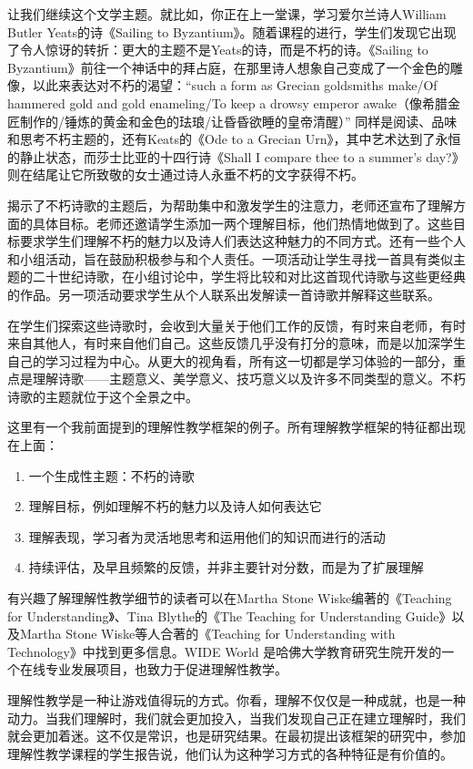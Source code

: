 让我们继续这个文学主题。就比如，你正在上一堂课，学习爱尔兰诗人William Butler Yeats的诗《Sailing to Byzantium》。随着课程的进行，学生们发现它出现了令人惊讶的转折：更大的主题不是Yeats的诗，而是不朽的诗。《Sailing to Byzantium》前往一个神话中的拜占庭，在那里诗人想象自己变成了一个金色的雕像，以此来表达对不朽的渴望：“such a form as Grecian goldsmiths make/Of hammered gold and gold enameling/To keep a drowsy emperor awake（像希腊金匠制作的/锤炼的黄金和金色的珐琅/让昏昏欲睡的皇帝清醒）” 同样是阅读、品味和思考不朽主题的，还有Keats的《Ode to a Grecian Urn》，其中艺术达到了永恒的静止状态，而莎士比亚的十四行诗《Shall I compare thee to a summer’s day?》则在结尾让它所致敬的女士通过诗人永垂不朽的文字获得不朽。

揭示了不朽诗歌的主题后，为帮助集中和激发学生的注意力，老师还宣布了理解方面的具体目标。老师还邀请学生添加一两个理解目标，他们热情地做到了。这些目标要求学生们理解不朽的魅力以及诗人们表达这种魅力的不同方式。还有一些个人和小组活动，旨在鼓励积极参与和个人责任。一项活动让学生寻找一首具有类似主题的二十世纪诗歌，在小组讨论中，学生将比较和对比这首现代诗歌与这些更经典的作品。另一项活动要求学生从个人联系出发解读一首诗歌并解释这些联系。

在学生们探索这些诗歌时，会收到大量关于他们工作的反馈，有时来自老师，有时来自其他人，有时来自他们自己。这些反馈几乎没有打分的意味，而是以加深学生自己的学习过程为中心。从更大的视角看，所有这一切都是学习体验的一部分，重点是理解诗歌——主题意义、美学意义、技巧意义以及许多不同类型的意义。不朽诗歌的主题就位于这个全景之中。

这里有一个我前面提到的理解性教学框架的例子。所有理解教学框架的特征都出现在上面：
\begin{enumerate}
    \item 一个生成性主题：不朽的诗歌
    \item 理解目标，例如理解不朽的魅力以及诗人如何表达它
    \item 理解表现，学习者为灵活地思考和运用他们的知识而进行的活动
    \item 持续评估，及早且频繁的反馈，并非主要针对分数，而是为了扩展理解
\end{enumerate}
	
有兴趣了解理解性教学细节的读者可以在Martha Stone Wiske编著的《Teaching for Understanding》、Tina Blythe的《The Teaching for Understanding Guide》以及Martha Stone Wiske等人合著的《Teaching for Understanding with Technology》中找到更多信息。WIDE World 是哈佛大学教育研究生院开发的一个在线专业发展项目，也致力于促进理解性教学。

理解性教学是一种让游戏值得玩的方式。你看，理解不仅仅是一种成就，也是一种动力。当我们理解时，我们就会更加投入，当我们发现自己正在建立理解时，我们就会更加着迷。这不仅是常识，也是研究结果。在最初提出该框架的研究中，参加理解性教学课程的学生报告说，他们认为这种学习方式的各种特征是有价值的。

